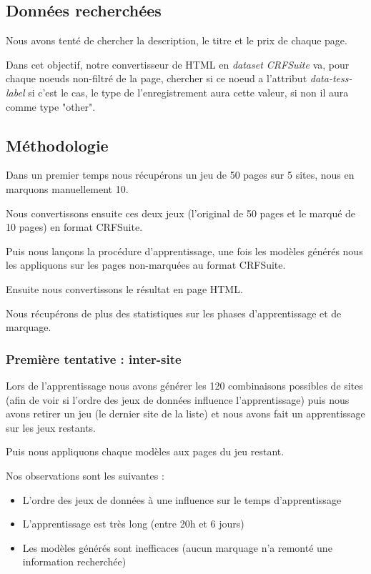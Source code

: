 \documentclass{article}
\begin{document}
\subsection{Données recherchées}
Nous avons tenté de chercher la description, le titre et le prix de chaque page.

Dans cet objectif, notre convertisseur de HTML en \emph{dataset CRFSuite} va, pour chaque
noeuds non-filtré de la page, chercher si ce noeud a l'attribut \emph{data-tess-label}
si c'est le cas, le type de l'enregistrement aura cette valeur, si non il aura comme
type "other".

\subsection{Méthodologie}
Dans un premier temps nous récupérons un jeu de 50 pages sur 5 sites, nous en
marquons manuellement 10.

Nous convertissons ensuite ces deux jeux (l'original de 50 pages et le marqué de 10
pages) en format CRFSuite.

Puis nous lançons la procédure d'apprentissage, une fois les modèles générés
nous les appliquons sur les pages non-marquées au format CRFSuite.

Ensuite nous convertissons le résultat en page HTML.

Nous récupérons de plus des statistiques sur les phases d'apprentissage et de
marquage.

\subsubsection{Première tentative : inter-site}
Lors de l'apprentissage nous avons générer les 120 combinaisons possibles de sites
(afin de voir si l'ordre des jeux de données influence l'apprentissage)
puis nous avons retirer un jeu (le dernier site de la liste) et nous avons fait
un apprentissage sur les jeux restants.

Puis nous appliquons chaque modèles aux pages du jeu restant.

Nos observations sont les suivantes :

\begin{itemize}
 \item L'ordre des jeux de données à une influence sur le temps d'apprentissage
 \item L'apprentissage est très long (entre 20h et 6 jours)
 \item Les modèles générés sont inefficaces (aucun marquage n'a remonté une information recherchée)
\end{itemize}
\end{document}
